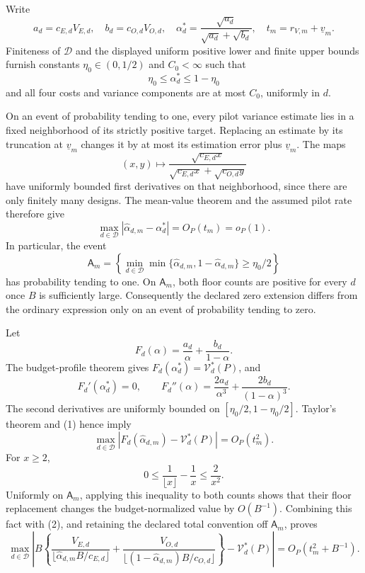 Write
\[
a_d=c_{E,d}V_{E,d},\quad b_d=c_{O,d}V_{O,d},\quad
\alpha_d^*=\frac{\sqrt{a_d}}{\sqrt{a_d}+\sqrt{b_d}},\quad
t_m=r_{V,m}+\underline v_m.
\]
Finiteness of \(\mathcal D\) and the displayed uniform positive lower and finite upper bounds furnish constants \(\eta_0\in(0,1/2)\) and \(C_0<\infty\) such that
\[
\eta_0\le\alpha_d^*\le1-\eta_0
\]
and all four costs and variance components are at most \(C_0\), uniformly in \(d\).

On an event of probability tending to one, every pilot variance estimate lies in a fixed neighborhood of its strictly positive target.  Replacing an estimate by its truncation at \(\underline v_m\) changes it by at most its estimation error plus \(\underline v_m\).  The maps
\[
(x,y)\longmapsto
\frac{\sqrt{c_{E,d}x}}
{\sqrt{c_{E,d}x}+\sqrt{c_{O,d}y}}
\]
have uniformly bounded first derivatives on that neighborhood, since there are only finitely many designs.  The mean-value theorem and the assumed pilot rate therefore give
\[
\max_{d\in\mathcal D}|\widehat\alpha_{d,m}-\alpha_d^*|
=O_P(t_m)=o_P(1).                                                    \tag{1}
\]
In particular, the event
\[
\mathsf A_m=\left\{\min_{d\in\mathcal D}\min
\{\widehat\alpha_{d,m},1-\widehat\alpha_{d,m}\}\ge\eta_0/2\right\}
\]
has probability tending to one.  On \(\mathsf A_m\), both floor counts are positive for every \(d\) once \(B\) is sufficiently large.  Consequently the declared zero extension differs from the ordinary expression only on an event of probability tending to zero.

Let
\[
F_d(\alpha)=\frac{a_d}{\alpha}+\frac{b_d}{1-\alpha}.
\]
The budget-profile theorem gives \(F_d(\alpha_d^*)=\mathcal V_d^*(P)\), and
\[
F_d'(\alpha_d^*)=0,\qquad
F_d''(\alpha)=\frac{2a_d}{\alpha^3}+\frac{2b_d}{(1-\alpha)^3}.
\]
The second derivatives are uniformly bounded on \([\eta_0/2,1-\eta_0/2]\).  Taylor's theorem and (1) hence imply
\[
\max_{d\in\mathcal D}
|F_d(\widehat\alpha_{d,m})-\mathcal V_d^*(P)|=O_P(t_m^2).           \tag{2}
\]
For \(x\ge2\),
\[
0\le\frac1{\lfloor x\rfloor}-\frac1x\le\frac2{x^2}.
\]
Uniformly on \(\mathsf A_m\), applying this inequality to both counts shows that their floor replacement changes the budget-normalized value by \(O(B^{-1})\).  Combining this fact with (2), and retaining the declared total convention off \(\mathsf A_m\), proves
\[
\max_{d\in\mathcal D}\left|B\left\{
\frac{V_{E,d}}{\lfloor\widehat\alpha_{d,m}B/c_{E,d}\rfloor}
+\frac{V_{O,d}}{\lfloor(1-\widehat\alpha_{d,m})B/c_{O,d}\rfloor}
\right\}-\mathcal V_d^*(P)\right|
=O_P(t_m^2+B^{-1}).
\]
